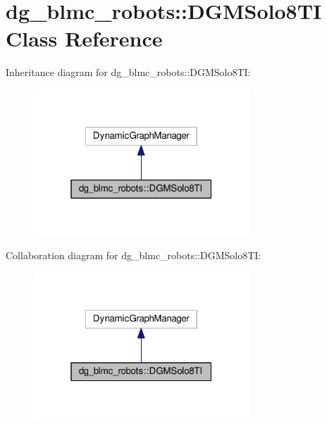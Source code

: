\hypertarget{classdg__blmc__robots_1_1DGMSolo8TI}{}\section{dg\+\_\+blmc\+\_\+robots\+:\+:D\+G\+M\+Solo8\+TI Class Reference}
\label{classdg__blmc__robots_1_1DGMSolo8TI}


Inheritance diagram for dg\+\_\+blmc\+\_\+robots\+:\+:D\+G\+M\+Solo8\+TI\+:
\nopagebreak
\begin{figure}[H]
\begin{center}
\leavevmode
\includegraphics[width=229pt]{classdg__blmc__robots_1_1DGMSolo8TI__inherit__graph}
\end{center}
\end{figure}


Collaboration diagram for dg\+\_\+blmc\+\_\+robots\+:\+:D\+G\+M\+Solo8\+TI\+:
\nopagebreak
\begin{figure}[H]
\begin{center}
\leavevmode
\includegraphics[width=229pt]{classdg__blmc__robots_1_1DGMSolo8TI__coll__graph}
\end{center}
\end{figure}
